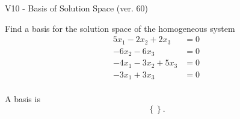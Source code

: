\begin{exercise}
  \begin{exerciseTitle}V10 - Basis of Solution Space (ver. 60)\end{exerciseTitle}
  \begin{exerciseStatement}
    Find a basis for the solution space of the homogeneous system 
\begin{align*}
 5 x_ 1 -2 x_ 2 + 2 x_ 3 &= 0  \\ 
  -6 x_ 2 -6 x_ 3 &= 0  \\ 
  -4 x_ 1 -3 x_ 2 + 5 x_ 3 &= 0  \\ 
  -3 x_ 1 + 3 x_ 3 &= 0  \\ 
 \end{align*}


 
  \end{exerciseStatement}

  \begin{exerciseAnswer}
   A basis is   
\[\left\{\right\}.\]

  


  \end{exerciseAnswer}
\end{exercise}